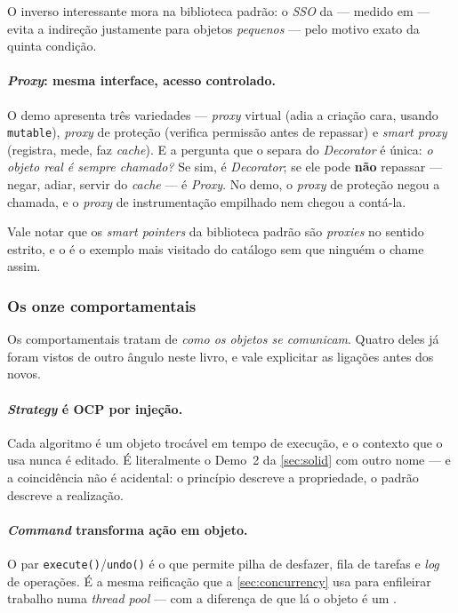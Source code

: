 O inverso interessante mora na biblioteca padrão: o \emph{SSO} da
 --- medido em  --- evita a indireção justamente para
objetos \emph{pequenos} --- pelo motivo exato da quinta condição.

\paragraph{\emph{Proxy}: mesma interface, acesso controlado.} O demo apresenta
três variedades --- \emph{proxy} virtual (adia a criação cara, usando
\texttt{mutable}), \emph{proxy} de proteção (verifica permissão antes de
repassar) e \emph{smart proxy} (registra, mede, faz \emph{cache}). E a pergunta
que o separa do \emph{Decorator} é única: \emph{o objeto real é sempre
chamado?} Se sim, é \emph{Decorator}; se ele pode \textbf{não} repassar ---
negar, adiar, servir do \emph{cache} --- é \emph{Proxy}. No demo, o
\emph{proxy} de proteção negou a chamada, e o \emph{proxy} de instrumentação
empilhado nem chegou a contá-la.

Vale notar que os \emph{smart pointers} da biblioteca padrão são \emph{proxies}
no sentido estrito, e o  é o exemplo mais visitado do
catálogo sem que ninguém o chame assim.

\subsubsection{Os onze comportamentais}

Os comportamentais tratam de \emph{como os objetos se comunicam}. Quatro deles
já foram vistos de outro ângulo neste livro, e vale explicitar as ligações antes
dos novos.

\paragraph{\emph{Strategy} é OCP por injeção.} Cada algoritmo é um objeto
trocável em tempo de execução, e o contexto que o usa nunca é editado. É
literalmente o Demo~2 da \cref{sec:solid} com outro nome --- e a coincidência
não é acidental: o princípio descreve a propriedade, o padrão descreve a
realização.

\paragraph{\emph{Command} transforma ação em objeto.} O par
\texttt{execute()}/\texttt{undo()} é o que permite pilha de desfazer, fila de
tarefas e \emph{log} de operações. É a mesma reificação que a
\cref{sec:concurrency} usa para enfileirar trabalho numa \emph{thread pool} ---
com a diferença de que lá o objeto é um .

